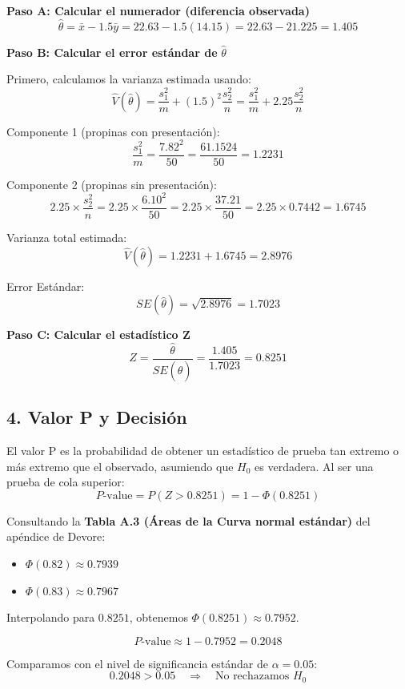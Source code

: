 \documentclass[12pt]{article}
\begin{document}
\textbf{Paso A: Calcular el numerador (diferencia observada)}
$$ \hat{\theta} = \bar{x} - 1.5\bar{y} = 22.63 - 1.5(14.15) = 22.63 - 21.225 = 1.405 $$

\textbf{Paso B: Calcular el error estándar de } $\hat{\theta}$

Primero, calculamos la varianza estimada usando:
$$ \hat{V}(\hat{\theta}) = \frac{s_1^2}{m} + (1.5)^2 \frac{s_2^2}{n} = \frac{s_1^2}{m} + 2.25 \frac{s_2^2}{n} $$

Componente 1 (propinas con presentación):
$$ \frac{s_1^2}{m} = \frac{7.82^2}{50} = \frac{61.1524}{50} = 1.2231 $$

Componente 2 (propinas sin presentación):
$$ 2.25 \times \frac{s_2^2}{n} = 2.25 \times \frac{6.10^2}{50} = 2.25 \times \frac{37.21}{50} = 2.25 \times 0.7442 = 1.6745 $$

Varianza total estimada:
$$ \hat{V}(\hat{\theta}) = 1.2231 + 1.6745 = 2.8976 $$

Error Estándar:
$$ SE(\hat{\theta}) = \sqrt{2.8976} = 1.7023 $$

\textbf{Paso C: Calcular el estadístico Z}
$$ Z = \frac{\hat{\theta}}{SE(\hat{\theta})} = \frac{1.405}{1.7023} = 0.8251 $$


\subsection*{4. Valor P y Decisión}

El valor P es la probabilidad de obtener un estadístico de prueba tan extremo o más extremo que el observado, asumiendo que $H_0$ es verdadera. Al ser una prueba de cola superior:
$$ P\text{-value} = P(Z > 0.8251) = 1 - \Phi(0.8251) $$

Consultando la \textbf{Tabla A.3 (Áreas de la Curva normal estándar)} del apéndice de Devore:
\begin{itemize}
    \item $\Phi(0.82) \approx 0.7939$
    \item $\Phi(0.83) \approx 0.7967$
\end{itemize}

Interpolando para $0.8251$, obtenemos $\Phi(0.8251) \approx 0.7952$.

$$ P\text{-value} \approx 1 - 0.7952 = 0.2048 $$

Comparamos con el nivel de significancia estándar de $\alpha = 0.05$:
$$ 0.2048 > 0.05 \quad \Rightarrow \quad \text{No rechazamos } H_0 $$
\end{document}
